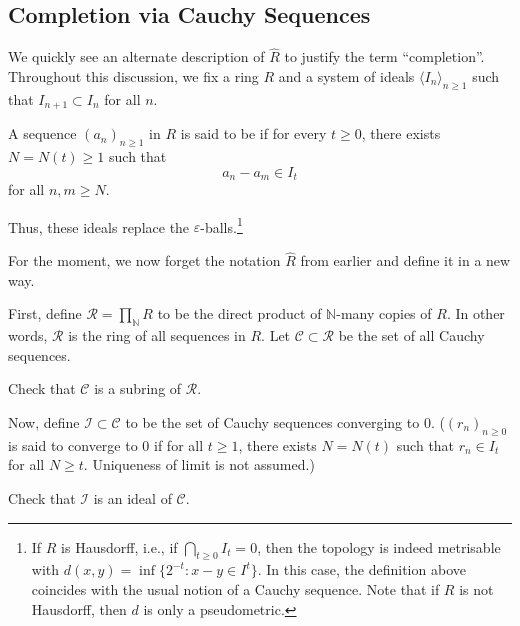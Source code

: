 \documentclass[12pt]{article}
\begin{document}
\subsection{Completion via Cauchy Sequences}

We quickly see an alternate description of $\widehat{R}$ to justify the term ``completion''. Throughout this discussion, we fix a ring $R$ and a system of ideals $\langle I_{n} \rangle_{n \ge 1}$ such that $I_{n + 1} \subset I_{n}$ for all $n$. %

\begin{defn}
	A sequence $(a_{n})_{n \ge 1}$ in $R$ is said to be  if for every $t \ge 0$, there exists $N = N(t) \ge 1$ such that
	\begin{equation*} 
		a_{n} - a_{m} \in I_{t}
	\end{equation*}
	for all $n, m \ge N$.
\end{defn}

Thus, these ideals replace the $\varepsilon$-balls.\footnote{If $R$ is Hausdorff, i.e., if $\bigcap_{t \ge 0} I_{t} = 0$, then the topology is indeed metrisable with $d(x, y) = \inf\{2^{-t} : x - y \in I^{t}\}$. In this case, the definition above coincides with the usual notion of a Cauchy sequence. Note that if $R$ is not Hausdorff, then $d$ is only a pseudometric.}

For the moment, we now forget the notation $\widehat{R}$ from earlier and define it in a new way.

First, define $\mathcal{R} = \prod_{\mathbb{N}} R$ to be the direct product of $\mathbb{N}$-many copies of $R$. In other words, $\mathcal{R}$ is the ring of all sequences in $R$. \newline
Let $\mathcal{C} \subset \mathcal{R}$ be the set of all Cauchy sequences.

\begin{exe}
	Check that $\mathcal{C}$ is a subring of $\mathcal{R}$.
\end{exe}

Now, define $\mathcal{I} \subset \mathcal{C}$ to be the set of Cauchy sequences converging to $0$. ($(r_{n})_{n \ge 0}$ is said to converge to $0$ if for all $t \ge 1$, there exists $N = N(t)$ such that $r_{n} \in I_{t}$ for all $N \ge t$. Uniqueness of limit is not assumed.)

\begin{exe}
	Check that $\mathcal{I}$ is an ideal of $\mathcal{C}$.
\end{exe}
\end{document}
